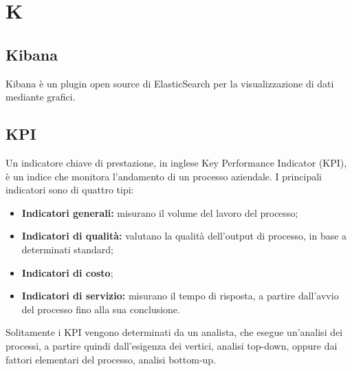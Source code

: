 \section{K}

    \subsection*{Kibana}

        Kibana è un plugin open source di ElasticSearch per la visualizzazione di dati mediante grafici.

    \subsection*{KPI}

        Un indicatore chiave di prestazione, in inglese Key Performance Indicator (KPI), è un indice che monitora
        l'andamento di un processo aziendale. I principali indicatori sono di quattro tipi:

            \begin{itemize}
                \item \textbf{Indicatori generali:} misurano il volume del lavoro del processo;
                \item \textbf{Indicatori di qualità:} valutano la qualità dell'output di processo, in base a determinati standard;
                \item \textbf{Indicatori di costo};
                \item \textbf{Indicatori di servizio:} misurano il tempo di risposta, a partire dall'avvio del processo fino alla sua conclusione.
            \end{itemize}

        Solitamente i KPI vengono determinati da un analista, che esegue un'analisi dei processi, a partire quindi
        dall'esigenza dei vertici, analisi top-down, oppure dai fattori elementari del processo, analisi bottom-up.

